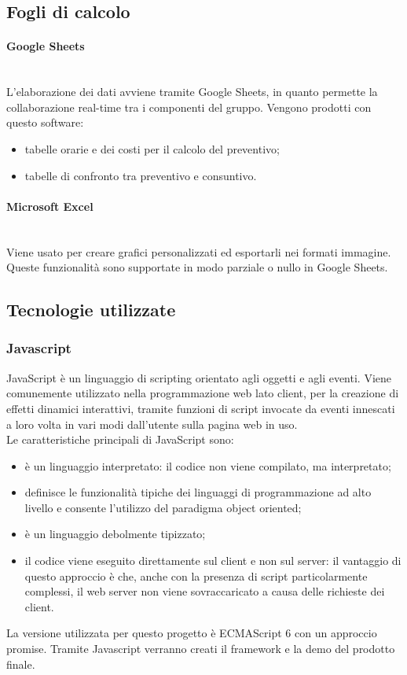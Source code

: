 \subsection{Fogli di calcolo} \label{sec:fogli_di_calcolo}
\paragraph{Google Sheets}\mbox{}\\
L'elaborazione dei dati avviene tramite Google Sheets, in quanto permette la collaborazione real-time tra i componenti del gruppo. Vengono prodotti con questo software:
	\begin{itemize}
	\item tabelle orarie e dei costi per il calcolo del preventivo;
	\item tabelle di confronto tra preventivo e consuntivo.
	\end{itemize}

\paragraph{Microsoft Excel} \mbox{}\\
Viene usato per creare grafici personalizzati ed esportarli nei formati immagine. Queste funzionalità sono supportate in modo parziale o nullo in Google Sheets. 

\subsection{Tecnologie utilizzate}
\subsubsection{Javascript}
JavaScript è un linguaggio di scripting orientato agli oggetti e agli eventi. Viene comunemente utilizzato nella programmazione web lato client, per la creazione di effetti dinamici interattivi, tramite funzioni di script invocate da eventi innescati a loro volta in vari modi dall'utente sulla pagina web in uso.\\
Le caratteristiche principali di JavaScript sono:
\begin{itemize}
	\item è un linguaggio interpretato: il codice non viene compilato, ma interpretato;
	\item definisce le funzionalità tipiche dei linguaggi di programmazione ad alto livello e consente l'utilizzo del paradigma object oriented;
	\item è un linguaggio debolmente tipizzato;
	\item il codice viene eseguito direttamente sul client e non sul server: il vantaggio di questo approccio è che, anche con la presenza di script particolarmente complessi, il web server non viene sovraccaricato a causa delle richieste dei client.
\end{itemize}
La versione utilizzata per questo progetto è ECMAScript 6 con un approccio promise.
Tramite Javascript verranno creati il framework e la demo del prodotto finale.

